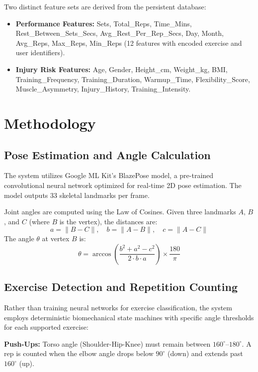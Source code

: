 \documentclass[conference]{IEEEtran}
\begin{document}
Two distinct feature sets are derived from the persistent database:
\begin{itemize}
\item \textbf{Performance Features:} Sets, Total\_Reps, Time\_Mins, Rest\_Between\_Sets\_Secs, Avg\_Rest\_Per\_Rep\_Secs, Day, Month, Avg\_Reps, Max\_Reps, Min\_Reps (12 features with encoded exercise and user identifiers).
\item \textbf{Injury Risk Features:} Age, Gender, Height\_cm, Weight\_kg, BMI, Training\_Frequency, Training\_Duration, Warmup\_Time, Flexibility\_Score, Muscle\_Asymmetry, Injury\_History, Training\_Intensity.
\end{itemize}

\section{Methodology}

\subsection{Pose Estimation and Angle Calculation}

The system utilizes Google ML Kit's BlazePose model, a pre-trained convolutional neural network optimized for real-time 2D pose estimation. The model outputs 33 skeletal landmarks per frame.

Joint angles are computed using the Law of Cosines. Given three landmarks $A$, $B$, and $C$ (where $B$ is the vertex), the distances are:
\begin{equation}
a = \|B - C\|, \quad b = \|A - B\|, \quad c = \|A - C\|
\end{equation}
The angle $\theta$ at vertex $B$ is:
\begin{equation}
\theta = \arccos\left(\frac{b^2 + a^2 - c^2}{2 \cdot b \cdot a}\right) \times \frac{180}{\pi}
\label{eq:angle}
\end{equation}

\subsection{Exercise Detection and Repetition Counting}

Rather than training neural networks for exercise classification, the system employs deterministic biomechanical state machines with specific angle thresholds for each supported exercise:

\textbf{Push-Ups:} Torso angle (Shoulder-Hip-Knee) must remain between $160^\circ$--$180^\circ$. A rep is counted when the elbow angle drops below $90^\circ$ (down) and extends past $160^\circ$ (up).
\end{document}
